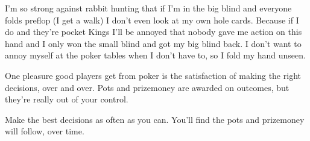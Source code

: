 I'm so strong against rabbit hunting that if I'm in the
big blind and everyone folds preflop (I get a walk) I don't even look
at my own hole cards. Because if I do and they're pocket Kings I'll be
annoyed that nobody gave me action on this hand and I only won the
small blind and got my big blind back. I don't want to annoy myself at
the poker tables when I don't have to, so I fold my hand unseen.

One pleasure good players get from poker is the satisfaction
of making the right decisions, over and over. Pots and prizemoney
are awarded on outcomes, but they're really out of your control.

Make the best decisions as often as you can. You'll find the pots
and prizemoney will follow, over time.
